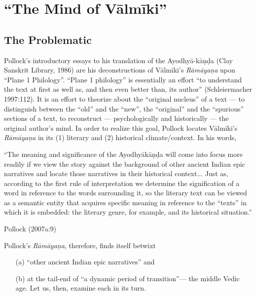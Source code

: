 \chapter{“The Mind of Vālmīki”}\label{chapter1}


\section{The Problematic}\label{sec1.1}

Pollock's introductory essays to his translation of the Ayodhyā-kāṇḍa (Clay Sanskrit Library, 1986) are his deconstructions of Vālmīki’s {\sl Rāmāyaṇa} upon “Plane 1 Philology”. “Plane 1 philology” is essentially an effort “to understand the text at first as well as, and then even better than, its author” (Schleiermacher 1997:112). It is an effort to theorize about the “original nucleus” of a text --- to distinguish between the “old” and the “new”, the “original” and the “spurious” sections of a text, to reconstruct --- psychologically and historically --- the original author's mind. In order to realize this goal, Pollock locates Vālmīki’s {\sl Rāmāyaṇa} in its (1) literary and (2) historical climate/context. In his words,  

\medskip
\begin{myquote}
“The meaning and significance of the Ayodhyākāṇḍa will come into focus more readily if we view the story against the background of other ancient Indian epic narratives and locate those narratives in their historical context... Just as, according to the first rule of  interpretation we determine the signification of a word in reference to the words surrounding it, so the literary text can be viewed as a semantic entity that acquires specific meaning in reference to the “texts” in which it is embedded: the literary genre, for example, and its historical situation.” 		
	       							         				      
\hfill  Pollock (2007a:9)
\end{myquote}

\newpage

Pollock's {\sl Rāmāyaṇa}, therefore, finds itself betwixt\\[-20pt] 
\begin{itemize}
\itemsep=1pt
\item[(a)] “other ancient Indian epic narratives” and

\item[(b)] at the tail-end of “a dynamic period of transition”--- the middle Vedic age. Let us, then, examine each in its turn.\\[-18pt]
\end{itemize}

